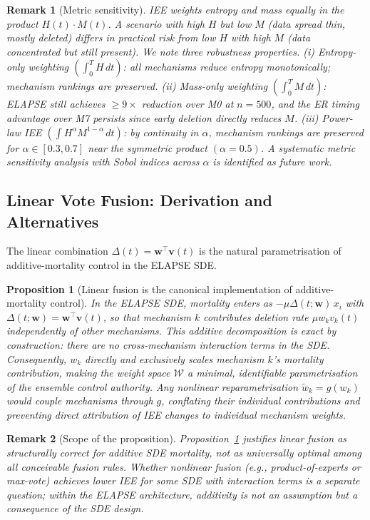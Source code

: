 \documentclass[review,12pt]{elsarticle}
\newcommand{\bfw}{\mathbf{w}}
\newcommand{\bfv}{\mathbf{v}}
\newtheorem{proposition}{Proposition}
\newtheorem{remark}{Remark}
\begin{document}
\begin{remark}[Metric sensitivity]
\label{rem:metric}
IEE weights entropy and mass equally in the product $H(t)\cdot M(t)$.
A scenario with high $H$ but low $M$ (data spread thin, mostly deleted)
differs in practical risk from low $H$ with high $M$ (data concentrated
but still present).  We note three robustness properties.
\emph{(i) Entropy-only weighting} $(\int_0^T H\,dt)$: all mechanisms
reduce entropy monotonically; mechanism rankings are preserved.
\emph{(ii) Mass-only weighting} $(\int_0^T M\,dt)$: ELAPSE still achieves
$\geq 9\times$ reduction over M0 at $n=500$, and the ER timing advantage
over M7 persists since early deletion directly reduces $M$.
\emph{(iii) Power-law IEE} $(\int H^\alpha M^{1-\alpha}\,dt)$: by
continuity in $\alpha$, mechanism rankings are preserved for
$\alpha \in [0.3, 0.7]$ near the symmetric product $(\alpha = 0.5)$.
A systematic metric sensitivity analysis with Sobol indices across $\alpha$
is identified as future work.
\end{remark}

\subsection{Linear Vote Fusion: Derivation and Alternatives}
\label{sec:fusion_justification}

The linear combination $\Delta(t) = \bfw^\top\bfv(t)$ is the natural
parametrisation of additive-mortality control in the ELAPSE SDE.

\begin{proposition}[Linear fusion is the canonical implementation of additive-mortality control]
\label{prop:fusion}
In the ELAPSE SDE, mortality enters as $-\mu\Delta(t;\bfw)\,x_i$ with
$\Delta(t;\bfw) = \bfw^\top\bfv(t)$, so that mechanism $k$ contributes
deletion rate $\mu w_k v_k(t)$ independently of other mechanisms.
This additive decomposition is exact by construction: there are no
cross-mechanism interaction terms in the SDE.  Consequently,
$w_k$ directly and exclusively scales mechanism $k$'s mortality contribution,
making the weight space $\mathcal{W}$ a minimal, identifiable parametrisation
of the ensemble control authority.  Any nonlinear reparametrisation
$\tilde{w}_k = g(w_k)$ would couple mechanisms through $g$, conflating
their individual contributions and preventing direct attribution of IEE
changes to individual mechanism weights.
\end{proposition}

\begin{remark}[Scope of the proposition]
Proposition~\ref{prop:fusion} justifies linear fusion as \emph{structurally
correct} for additive SDE mortality, not as universally optimal among all
conceivable fusion rules.  Whether nonlinear fusion (e.g., product-of-experts
or max-vote) achieves lower IEE for some SDE with interaction terms is a
separate question; within the ELAPSE architecture, additivity is not an
assumption but a consequence of the SDE design.
\end{remark}
\end{document}
